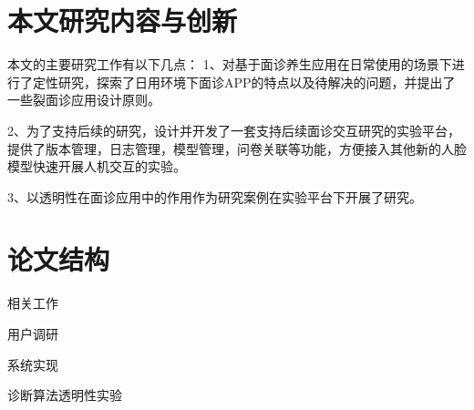 











\section{本文研究内容与创新}

本文的主要研究工作有以下几点：
1、对基于面诊养生应用在日常使用的场景下进行了定性研究，探索了日用环境下面诊APP的特点以及待解决的问题，并提出了一些裂面诊应用设计原则。

2、为了支持后续的研究，设计并开发了一套支持后续面诊交互研究的实验平台，提供了版本管理，日志管理，模型管理，问卷关联等功能，方便接入其他新的人脸模型快速开展人机交互的实验。

3、以透明性在面诊应用中的作用作为研究案例在实验平台下开展了研究。














\section{论文结构}

相关工作

用户调研
    
系统实现

诊断算法透明性实验